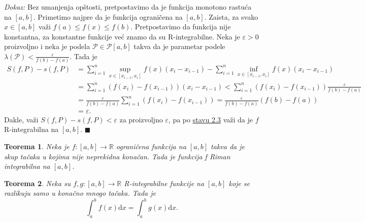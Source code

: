 \documentclass{article}
\newtheorem{teorema}{Teorema}[section]
\begin{document}
\textit{Dokaz:} Bez umanjenja opštosti, pretpostavimo da je funkcija monotono rastuća na $\left[a, b\right]$.
Primetimo najpre da je funkcija ograničena na $\left[a,b\right]$. Zaista, za svako $x \in \left[a, b\right]$ važi $f\left(a\right) \leq f\left(x\right) \leq f\left(b\right)$.
Pretpostavimo da funkcija nije konstantna, za konstantne funkcije već znamo da su R-integrabilne.
Neka je $\varepsilon > 0$ proizvoljno i neka je podela $\mathcal{P} \in \mathcal{P}\left[a, b\right]$ takva da je parametar podele
$\lambda\left(\mathcal{P}\right) < \frac{\varepsilon}{f\left(b\right) - f\left(a\right)}$. Tada je
\begin{align*}
    S\left(f, P\right) - s\left(f, P\right) & = \sum^n_{i = 1}\sup_{x\in\left[x_{i-1}, x_i\right]}f\left(x\right)\left(x_i - x_{i-1}\right) - \sum^n_{i = 1}\inf_{x\in\left[x_{i-1}, x_i\right]}f\left(x\right)\left(x_i - x_{i-1}\right)                                      \\
                                            & = \sum_{i=1}^n\left(f\left(x_i\right)-f\left(x_{i-1}\right)\right)\left(x_i - x_{i-1}\right) < \sum^n_{i=1}\left(f\left(x_i\right) - f\left(x_{i-1}\right)\right)\frac{\varepsilon}{f\left(b\right) - f\left(a\right)}           \\
                                            & = \frac{\varepsilon}{f\left(b\right) - f\left(a\right)}\sum^n_{i=1}\left(f\left(x_i\right) - f\left(x_{i-1}\right)\right) = \frac{\varepsilon}{f\left(b\right) - f\left(a\right)} \left(f\left(b\right) - f\left(a\right)\right) \\
                                            & = \varepsilon.
\end{align*}
Dakle, važi $S\left(f, P\right) - s\left(f, P\right)<\varepsilon$ za proizvoljno $\varepsilon$, pa po \hyperref[stav_2.3]{stavu 2.3} važi da je $f$
R-integrabilna na $\left[a,b\right]$.
\null\hfill $\blacksquare$\par

\begin{teoremabox}
    \label{teorema_2.5}
    \begin{teorema}
        Neka je $f:\left[a, b\right] \longrightarrow \mathbb{R}$ ograničena funkcija na $\left[a, b\right]$ takva da je skup tačaka u kojima nije neprekidna konačan. Tada je funkcija f Riman integrabilna na $\left[a, b\right]$.
    \end{teorema}
\end{teoremabox}

\begin{teoremabox}
    \label{teorema_2.6}
    \begin{teorema}
        Neka su $f, g: \left[a, b\right] \longrightarrow \mathbb{R}$ R-integrabilne funkcije na $\left[a, b\right]$ koje se razlikuju samo u konačno mnogo tačaka. Tada je
        $$\displaystyle \int_a^b f\left(x\right)\text{d}x = \int_a^b g\left(x\right)\text{d}x.$$
    \end{teorema}
\end{teoremabox}
\end{document}
